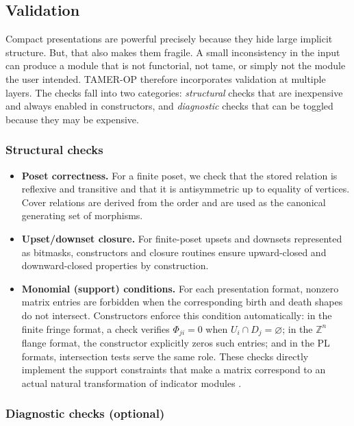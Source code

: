 \documentclass{article}
\newcommand{\<}{\langle}
\renewcommand{\>}{\rangle}
\theoremstyle{definition}
\theoremstyle{remark}
\begin{document}
	\subsection{Validation}\label{subsec:format-validation}
	
	Compact presentations are powerful precisely because they hide large implicit structure. But, that also makes them fragile. A small inconsistency in the input can produce a module that is not functorial, not tame, or simply not the module the user intended.  TAMER-OP therefore incorporates validation at multiple layers.  The checks fall into two categories: \emph{structural} checks that are inexpensive and always enabled in constructors, and \emph{diagnostic} checks that can be toggled because they may be expensive.
	
	\subsubsection*{Structural checks}
	
	\begin{itemize}
		\item \textbf{Poset correctness.}  For a finite poset, we check that the stored relation is reflexive and transitive and that it is antisymmetric up to equality of vertices.  Cover relations are derived from the order and are used as the canonical generating set of morphisms.
		\item \textbf{Upset/downset closure.}  For finite-poset upsets and downsets represented as bitmasks, constructors
		and closure routines ensure upward-closed and downward-closed properties by construction.
		\item \textbf{Monomial (support) conditions.}  For each presentation format, nonzero matrix entries are forbidden
		when the corresponding birth and death shapes do not intersect.  Constructors enforce this condition
		automatically:
		in the finite fringe format, a check verifies $\Phi_{ji}=0$ when $U_i\cap D_j=\varnothing$; in the $\mathbb{Z}^n$
		flange format, the constructor explicitly zeros such entries; and in the PL formats, intersection tests serve the
		same role.  These checks directly implement the support constraints that make a matrix correspond to an actual
		natural transformation of indicator modules \cite[Prop.~3.18]{Mil20}.
	\end{itemize}
	
	\subsubsection*{Diagnostic checks (optional)}
	
\end{document}
